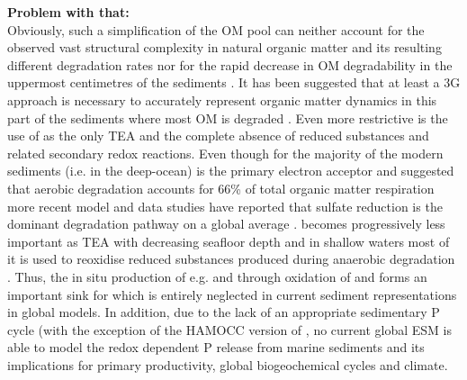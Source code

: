 \documentclass[gmd, manuscript]{copernicus}
\begin{document}

\textbf{Problem with that:} \\
Obviously, such a simplification of the OM pool can neither account for the observed vast structural complexity in natural organic matter and its resulting different degradation 
rates nor for the rapid decrease in OM degradability in the uppermost centimetres of the sediments \citep{arndt_quantifying_2013}. It has been suggested that at least a 3G approach 
is necessary to accurately represent organic matter dynamics in this part of the sediments where most OM is degraded \citep[e.g.][]{soetaert_model_1996}. 
Even more restrictive is the use of  as the only TEA and the complete absence of reduced substances and related secondary redox reactions. 
Even though for the majority of the modern sediments (i.e. in the deep-ocean)  is the primary electron acceptor and 
\citet{archer_model_2002} suggested that aerobic degradation accounts for 66\% of total organic matter respiration 
more recent model and data studies have reported that sulfate reduction is the dominant degradation pathway on a global average 
\citep[with contributions of 55-76\%][]{canfield_aquatic_2005, jorgensen_sulfur_2006, thullner_global_scale_2009}.  becomes 
progressively less important as TEA with decreasing seafloor depth and in shallow waters most of it is used to reoxidise reduced substances produced during anaerobic degradation \citep{canfield_aquatic_2005, thullner_global_scale_2009}. 
Thus, the in situ production of e.g.  and  through oxidation of  and  forms an important sink for  which is entirely neglected in 
current sediment representations in global models. In addition, due to the lack of an appropriate sedimentary P cycle (with the exception of the HAMOCC version of \citet{palastanga_long_term_2011}, no current global ESM is able to model 
the redox dependent P release from marine sediments and its implications for primary productivity, global biogeochemical cycles and climate. 

\end{document}
